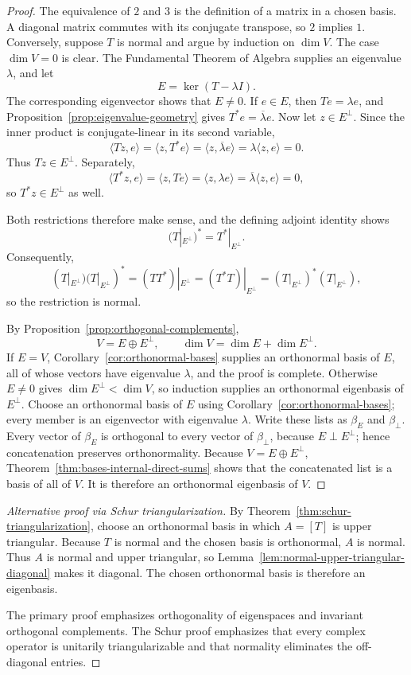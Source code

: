 \begin{proof}
The equivalence of \(2\) and \(3\) is the definition of a matrix in a chosen
basis. A diagonal matrix commutes with its conjugate transpose, so \(2\)
implies \(1\). Conversely, suppose \(T\) is normal and argue by induction on
\(\dim V\). The case \(\dim V=0\) is clear. The Fundamental Theorem of
Algebra supplies an eigenvalue \(\lambda\), and let
\[
E=\ker(T-\lambda I).
\]
The corresponding eigenvector shows that \(E\ne0\). If \(e\in E\), then
\(Te=\lambda e\), and Proposition~\ref{prop:eigenvalue-geometry} gives
\(T^*e=\overline\lambda e\). Now let \(z\in E^\perp\). Since the inner
product is conjugate-linear in its second variable,
\[
\langle Tz,e\rangle
=\langle z,T^*e\rangle
=\langle z,\overline\lambda e\rangle
=\lambda\langle z,e\rangle=0.
\]
Thus \(Tz\in E^\perp\). Separately,
\[
\langle T^*z,e\rangle
=\langle z,Te\rangle
=\langle z,\lambda e\rangle
=\overline\lambda\langle z,e\rangle=0,
\]
so \(T^*z\in E^\perp\) as well.

Both restrictions therefore make sense, and the defining adjoint identity
shows
\[
(T|_{E^\perp})^*=T^*|_{E^\perp}.
\]
Consequently,
\[
(T|_{E^\perp})(T|_{E^\perp})^*
=(TT^*)|_{E^\perp}
=(T^*T)|_{E^\perp}
=(T|_{E^\perp})^*(T|_{E^\perp}),
\]
so the restriction is normal.

By Proposition~\ref{prop:orthogonal-complements},
\[
V=E\oplus E^\perp,\qquad
\dim V=\dim E+\dim E^\perp.
\]
If \(E=V\), Corollary~\ref{cor:orthonormal-bases} supplies an orthonormal
basis of \(E\), all of whose vectors have eigenvalue \(\lambda\), and the
proof is complete. Otherwise \(E\ne0\) gives
\(\dim E^\perp<\dim V\), so induction supplies an orthonormal eigenbasis of
\(E^\perp\). Choose an orthonormal basis of \(E\) using
Corollary~\ref{cor:orthonormal-bases}; every member is an eigenvector with
  eigenvalue \(\lambda\). Write these lists as \(\beta_E\) and
  \(\beta_\perp\). Every vector of \(\beta_E\) is orthogonal to every vector
  of \(\beta_\perp\), because \(E\perp E^\perp\); hence concatenation preserves
  orthonormality. Because \(V=E\oplus E^\perp\),
  Theorem~\ref{thm:bases-internal-direct-sums} shows that the concatenated list
  is a basis of all of \(V\). It is therefore an orthonormal eigenbasis of
  \(V\).
\end{proof}

\begin{proof}[Alternative proof via Schur triangularization]
By Theorem~\ref{thm:schur-triangularization}, choose an orthonormal basis in
which \(A=[T]\) is upper triangular. Because \(T\) is normal and the chosen
basis is orthonormal, \(A\) is normal. Thus \(A\) is normal and upper
triangular, so
Lemma~\ref{lem:normal-upper-triangular-diagonal} makes it diagonal. The
chosen orthonormal basis is therefore an eigenbasis.

The primary proof emphasizes orthogonality of eigenspaces and invariant
orthogonal complements. The Schur proof emphasizes that every complex
operator is unitarily triangularizable and that normality eliminates the
off-diagonal entries.
\end{proof}


